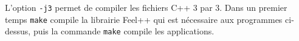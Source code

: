 L'option \lstinline{-j3} permet de compiler les fichiers C++ 3 par 3. Dans un
premier temps \lstinline{make} compile la librairie Feel++ qui est nécessaire
aux programmes ci-dessus, puis la commande \lstinline{make} compile les
applications.


